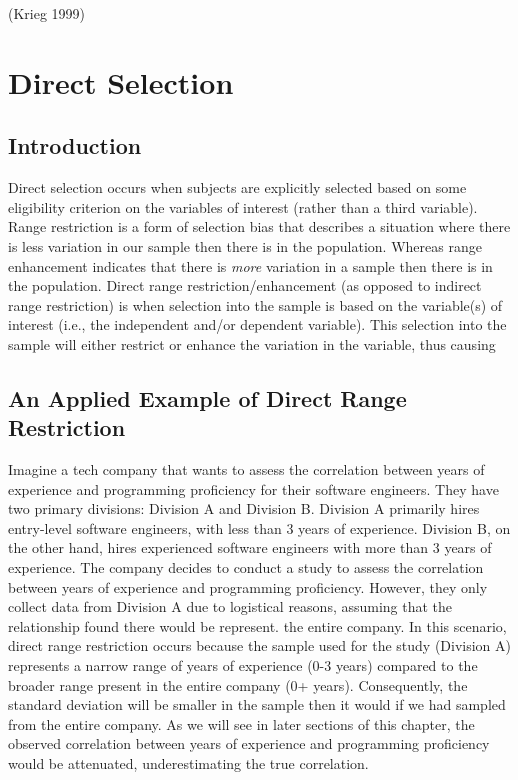 \documentclass[
  letterpaper,
  DIV=11,
  numbers=noendperiod]{scrreprt}
\begin{document}
(Krieg 1999)

\hypertarget{sec-direct_range_restriction}{%
\chapter{Direct Selection}\label{sec-direct_range_restriction}}

\hypertarget{introduction-3}{%
\section{Introduction}\label{introduction-3}}

Direct selection occurs when subjects are explicitly selected based on
some eligibility criterion on the variables of interest (rather than a
third variable). Range restriction is a form of selection bias that
describes a situation where there is less variation in our sample then
there is in the population. Whereas range enhancement indicates that
there is \emph{more} variation in a sample then there is in the
population. Direct range restriction/enhancement (as opposed to indirect
range restriction) is when selection into the sample is based on the
variable(s) of interest (i.e., the independent and/or dependent
variable). This selection into the sample will either restrict or
enhance the variation in the variable, thus causing

\hypertarget{an-applied-example-of-direct-range-restriction}{%
\section{An Applied Example of Direct Range
Restriction}\label{an-applied-example-of-direct-range-restriction}}

Imagine a tech company that wants to assess the correlation between
years of experience and programming proficiency for their software
engineers. They have two primary divisions: Division A and Division B.
Division A primarily hires entry-level software engineers, with less
than 3 years of experience. Division B, on the other hand, hires
experienced software engineers with more than 3 years of experience. The
company decides to conduct a study to assess the correlation between
years of experience and programming proficiency. However, they only
collect data from Division A due to logistical reasons, assuming that
the relationship found there would be represent. the entire company. In
this scenario, direct range restriction occurs because the sample used
for the study (Division A) represents a narrow range of years of
experience (0-3 years) compared to the broader range present in the
entire company (0+ years). Consequently, the standard deviation will be
smaller in the sample then it would if we had sampled from the entire
company. As we will see in later sections of this chapter, the observed
correlation between years of experience and programming proficiency
would be attenuated, underestimating the true correlation.
\end{document}
